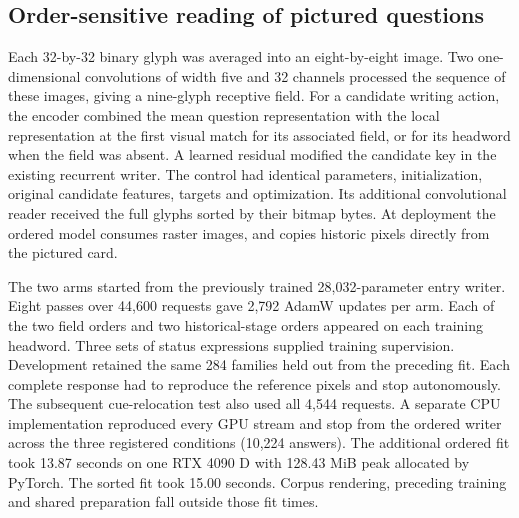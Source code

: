 \subsection*{Order-sensitive reading of pictured questions}
Each 32-by-32 binary glyph was averaged into an eight-by-eight image. Two one-dimensional convolutions of width five and 32 channels processed the sequence of these images, giving a nine-glyph receptive field. For a candidate writing action, the encoder combined the mean question representation with the local representation at the first visual match for its associated field, or for its headword when the field was absent. A learned residual modified the candidate key in the existing recurrent writer. The control had identical parameters, initialization, original candidate features, targets and optimization. Its additional convolutional reader received the full glyphs sorted by their bitmap bytes. At deployment the ordered model consumes raster images, and copies historic pixels directly from the pictured card.

The two arms started from the previously trained 28,032-parameter entry writer. Eight passes over 44,600 requests gave 2,792 AdamW updates per arm. Each of the two field orders and two historical-stage orders appeared on each training headword. Three sets of status expressions supplied training supervision. Development retained the same 284 families held out from the preceding fit. Each complete response had to reproduce the reference pixels and stop autonomously. The subsequent cue-relocation test also used all 4,544 requests. A separate CPU implementation reproduced every GPU stream and stop from the ordered writer across the three registered conditions (10,224 answers). The additional ordered fit took 13.87 seconds on one RTX 4090 D with 128.43 MiB peak allocated by PyTorch. The sorted fit took 15.00 seconds. Corpus rendering, preceding training and shared preparation fall outside those fit times.
